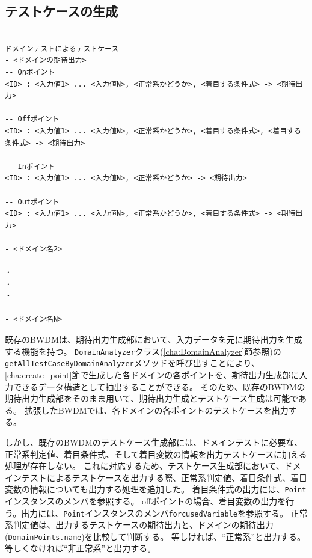 \documentclass[uplatex, report, a4j, 10pt]{jsbook}
\newcommand\ttt[1]{\texttt{#1}}
\begin{document}
\subsection{テストケースの生成}
\lstset{language=}
\noindent\begin{minipage}{\textwidth}
  \begin{lstlisting}[caption=ドメイン分析テストのためのテストケースの出力フォーマット,label=fig:dmin_output_format]

ドメインテストによるテストケース
- <ドメインの期待出力>
-- Onポイント
<ID> : <入力値1> ... <入力値N>, <正常系かどうか>, <着目する条件式> -> <期待出力>

-- Offポイント
<ID> : <入力値1> ... <入力値N>, <正常系かどうか>, <着目する条件式>, <着目する条件式> -> <期待出力>

-- Inポイント
<ID> : <入力値1> ... <入力値N>, <正常系かどうか> -> <期待出力>

-- Outポイント
<ID> : <入力値1> ... <入力値N>, <正常系かどうか>, <着目する条件式> -> <期待出力>

- <ドメイン名2>

・
・
・

- <ドメイン名N>

\end{lstlisting}
\end{minipage}

既存のBWDMは、期待出力生成部において、入力データを元に期待出力を生成する機能を持つ。
\ttt{DomainAnalyzer}クラス(\ref{cha:DomainAnalyzer}節参照)の\ttt{getAllTestCaseByDomainAnalyzer}メソッドを呼び出すことにより、\ref{cha:create_point}節で生成した各ドメインの各ポイントを、期待出力生成部に入力できるデータ構造として抽出することができる。
そのため、既存のBWDMの期待出力生成部をそのまま用いて、期待出力生成とテストケース生成は可能である。
拡張したBWDMでは、各ドメインの各ポイントのテストケースを出力する。

しかし、既存のBWDMのテストケース生成部には、ドメインテストに必要な、正常系判定値、着目条件式、そして着目変数の情報を出力テストケースに加える処理が存在しない。
これに対応するため、テストケース生成部において、ドメインテストによるテストケースを出力する際、正常系判定値、着目条件式、着目変数の情報についても出力する処理を追加した。
着目条件式の出力には、\ttt{Point}インスタンスのメンバ\forcusedConditionalExpression{}を参照する。
offポイントの場合、着目変数の出力を行う。出力には、\ttt{Point}インスタンスのメンバ\ttt{forcusedVariable}を参照する。
正常系判定値は、出力するテストケースの期待出力と、ドメインの期待出力(\ttt{DomainPoints.name})を比較して判断する。
等しければ、“正常系”と出力する。等しくなければ“非正常系”と出力する。
\end{document}
